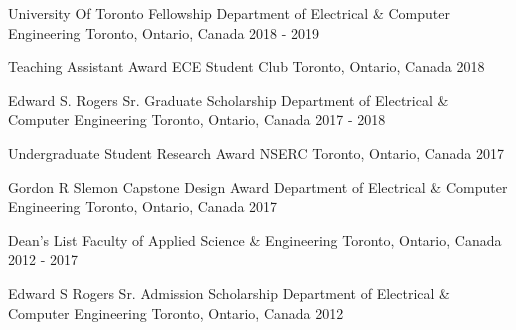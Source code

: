 \begin{cvhonors}

  \cvhonor
    {University Of Toronto Fellowship} %
    {Department of Electrical \& Computer Engineering} %
    {Toronto, Ontario, Canada} %
    {2018 - 2019} %

  \cvhonor
    {Teaching Assistant Award} %
    {ECE Student Club} %
    {Toronto, Ontario, Canada} %
    {2018} %

  \cvhonor
    {Edward S. Rogers Sr. Graduate Scholarship} %
    {Department of Electrical \& Computer Engineering} %
    {Toronto, Ontario, Canada} %
    {2017 - 2018} %

  \cvhonor
    {Undergraduate Student Research Award} %
    {NSERC} %
    {Toronto, Ontario, Canada} %
    {2017} %

  \cvhonor
    {Gordon R Slemon Capstone Design Award} %
    {Department of Electrical \& Computer Engineering} %
    {Toronto, Ontario, Canada} %
    {2017} %

  \cvhonor
    {Dean's List} %
    {Faculty of Applied Science \& Engineering} %
    {Toronto, Ontario, Canada} %
    {2012 - 2017} %
				
  \cvhonor
    {Edward S Rogers Sr. Admission Scholarship} %
    {Department of Electrical \& Computer Engineering} %
    {Toronto, Ontario, Canada} %
    {2012} %
		
\end{cvhonors}
